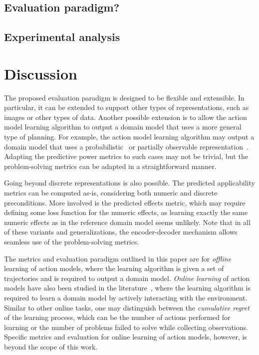 \documentclass{article}
\theoremstyle{definition}
\theoremstyle{remark}
\newif\ifaddcomments
\newcommand{\todo}[1]{\ifaddcomments{\textcolor{red}{[TODO: #1]}}\fi}
\newcommand{\roni}[1]{\ifaddcomments{\textcolor{red}{[Roni: #1]}}\fi}
\newcommand{\yarin}[1]{\ifaddcomments{\textcolor{teal}{[Yarin: #1]}}\fi}
\begin{document}
{\subsection{Evaluation paradigm?}
\subsection{Experimental analysis}
}

\section{Discussion}
\roni{For all: please read and let me know what you think by adding comments in the text (e.g., add text like this ``[[YourName: bla bla bla'']]) or editting.}
The proposed evaluation paradigm is designed to be flexible and extensible. 
In particular, it can be extended to support other types of representations, such as images or other types of data. 
Another possible extension is to allow the action model learning algorithm to output a domain model that uses a more general type of planning. 
For example, the action model learning algorithm may output a domain model that uses a probabilistic~\citep{xi2024neuro} or partially observable representation~\citep{le2024learning}. 
Adapting the predictive power metrics to such cases may not be trivial, but the problem-solving metrics can be adapted in a straightforward manner.


Going beyond discrete representations is also possible. 
The predicted applicability metrics can be computed as-is, considering both numeric and discrete preconditions.
More involved is the predicted effects metric, which may require defining some loss function for the numeric effects, as learning exactly the same numeric effects as in the reference domain model seems unlikely. 
Note that in all of these variants and generalizations, the encoder-decoder mechanism allows seamless use of the problem-solving metrics. 

\yarin{We can add a section on trajectories with not successful actions too @Argaman}

\todo{Maybe talk about metrics for online learning}
The metrics and evaluation paradigm outlined in this paper are for \emph{offline} learning of action models, where the learning algorithm is given a set of trajectories and is required to output a domain model. \emph{Online learning} of action models have also been studied in the literature~\citep{lamanna2021online, sreedharan2023optimistic, benyamin2025integratingreinforcementlearningaction, ng2019incremental, chitnis2021glib, verma2023autonomous, karia2023epistemic, jin2022creativity}\todo{More citations?}, where the learning algorithm is required to learn a domain model by actively interacting with the environment. Similar to other online tasks, one may distinguish between the \emph{cumulative regret} of the learning process, which can be the number of actions performed for learning or the number of problems failed to solve while collecting observations. 
Specific metrics and evaluation for online learning of action models, however, is beyond the scope of this work. 
\end{document}
